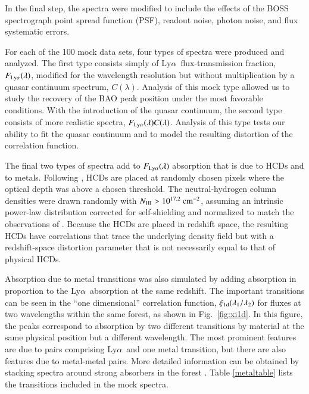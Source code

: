 \documentclass{aa}
\newcommand{\xionedim}{\xi_{\rm 1d}}
\newcommand{\Lya}{Ly$\alpha$~}
\newcommand{\NHI}{N_{\rm HI}}
\begin{document}
In the final step, the spectra were modified to include the effects of 
the BOSS spectrograph point spread function (PSF), 
readout noise, photon noise, and flux systematic errors.


For each of the 100 mock data sets,
four types of spectra were produced and analyzed.
The first type consists simply of \Lya flux-transmission
fraction, $F_{\rm Ly\alpha}(\lambda)$, modified for the  wavelength resolution  but
without multiplication by a quasar continuum spectrum, $C(\lambda)$.
Analysis of this
mock type allowed us to study the recovery of the BAO peak position
under the most favorable conditions.
With the introduction of the quasar continuum,
the second type consists of more realistic spectra,
$F_{\rm Ly\alpha}(\lambda)C(\lambda)$.
Analysis of this type tests our ability to fit the quasar
continuum and to model the resulting distortion of the correlation
function.

The final two types of spectra add to $F_{\rm Ly\alpha}(\lambda)$
absorption that is
due to HCDs and to metals.
Following  \citet{2012JCAP...07..028F},
HCDs are placed at randomly chosen
pixels where the  optical depth was above a chosen
threshold. 
The neutral-hydrogen column densities
were drawn randomly with  $\NHI> 10^{17.2}~{\rm cm^{-2}}$,
assuming an intrinsic power-law distribution corrected for
self-shielding and normalized 
to match the observations of
\citet{2005ApJ...635..123P}.
Because the HCDs are placed in redshift space,
the resulting HCDs have correlations that trace
the underlying density field but with a redshift-space distortion
parameter
that is not necessarily equal to that of physical HCDs.

Absorption due to metal transitions
was also simulated by adding absorption 
in proportion to the \Lya absorption at the same redshift.
The important transitions can be seen 
in the ``one dimensional''
correlation function, $\xionedim(\lambda_1/\lambda_2)$ 
for fluxes at two wavelengths within the same forest,
as shown in Fig.~\ref{fig:xi1d}.
In this figure, the peaks correspond to absorption by two different
transitions by material at the same physical position but a different 
wavelength.
The most prominent features are due to pairs comprising \Lya and one
metal transition, but there are also features due to metal-metal pairs.
More detailed information can be obtained by stacking spectra
around strong absorbers in the forest 
\citep{2010ApJ...724L..69P,2014MNRAS.441.1718P}.
Table \ref{metaltable} lists the transitions included in the
mock spectra.
\end{document}
